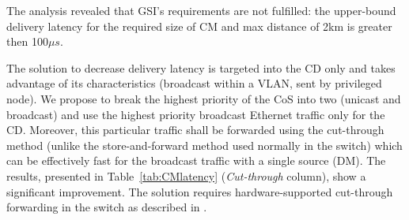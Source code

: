 The analysis revealed that GSI's requirements are not fulfilled: the upper-bound delivery latency
for the required size of CM and max distance of 2km is greater then 100$\mu s$. 

The solution to decrease delivery latency is targeted into the CD only and 
takes advantage of its characteristics (broadcast within a VLAN, sent by privileged node). 
We propose to break the highest priority of 
the CoS into two (unicast and broadcast) and use the highest priority broadcast Ethernet traffic only for 
the CD. Moreover, this particular traffic shall be forwarded using the cut-through method 
(unlike the store-and-forward method used normally in the switch) which can be effectively fast 
for the broadcast traffic with a single source (DM). The results, 
presented in Table~\ref{tab:CMlatency} ({\it Cut-through} column), show a significant improvement. 
The solution requires hardware-supported cut-through forwarding in the switch as described 
in \cite{biblio:robustness}. 

